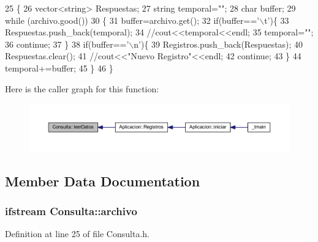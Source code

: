 \begin{DoxyCode}
25 \{
26     vector<string> Respuestas;
27     \textcolor{keywordtype}{string} temporal=\textcolor{stringliteral}{""};
28     \textcolor{keywordtype}{char} buffer;
29     \textcolor{keywordflow}{while} (archivo.good())
30     \{
31         buffer=archivo.get();
32         \textcolor{keywordflow}{if}(buffer==\textcolor{charliteral}{'\(\backslash\)t'})\{
33             Respuestas.push\_back(temporal);
34             \textcolor{comment}{//cout<<temporal<<endl;}
35             temporal=\textcolor{stringliteral}{""};
36             \textcolor{keywordflow}{continue};
37         \}
38         \textcolor{keywordflow}{if}(buffer==\textcolor{charliteral}{'\(\backslash\)n'})\{
39             Registros.push\_back(Respuestas);
40             Respuestas.clear();
41             \textcolor{comment}{//cout<<"Nuevo Registro"<<endl;}
42             \textcolor{keywordflow}{continue};
43         \}
44         temporal+=buffer;
45     \}
46 \}
\end{DoxyCode}


Here is the caller graph for this function\-:
\nopagebreak
\begin{figure}[H]
\begin{center}
\leavevmode
\includegraphics[width=350pt]{class_consulta_a559e96b607fd1ac665628432f399e0c5_icgraph}
\end{center}
\end{figure}




\subsection{Member Data Documentation}
\subsubsection[{archivo}]{\setlength{\rightskip}{0pt plus 5cm}ifstream Consulta\-::archivo\hspace{0.3cm}{\ttfamily [private]}}\label{class_consulta_aee038d050fa188962105e79e4680f402}


Definition at line 25 of file Consulta.\-h.

